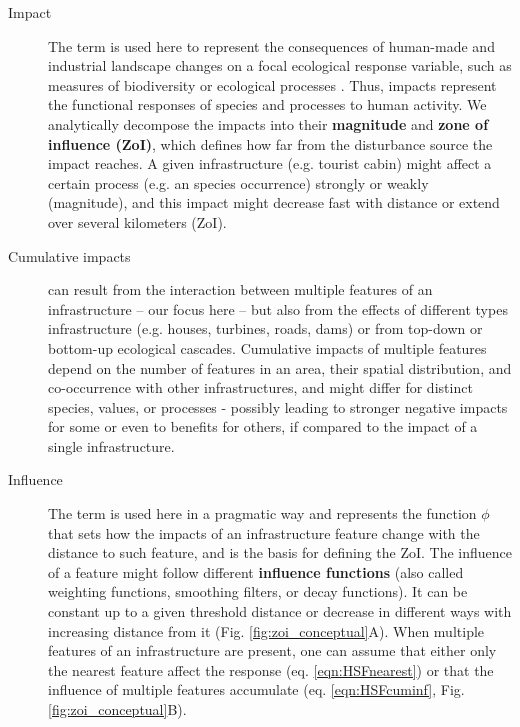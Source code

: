 \documentclass[titlepage]{article}
\begin{document}
\begin{tcolorbox}[width=1.3\textwidth,center,colback=yellow!5,colframe=yellow!75!black,title={Box 1 -- Definitions}]

\begin{description}

    \item[Impact] The term is used here to represent the consequences of human-made and industrial landscape changes on a focal ecological response variable, such as measures of biodiversity or ecological processes \citep{naugle_unifying_2011}. Thus, impacts represent the functional responses of species and processes to human activity. We analytically decompose the impacts into their \textbf{magnitude} and \textbf{zone of influence (ZoI)}, which defines how far from the disturbance source the impact reaches. A given infrastructure (e.g. tourist cabin) might affect a certain process (e.g. an species occurrence) strongly or weakly (magnitude), and this impact might decrease fast with distance or extend over several kilometers (ZoI).
    
    \item[Cumulative impacts] can result from the interaction between multiple features of an infrastructure -- our focus here -- but also from the effects of different types infrastructure (e.g. houses, turbines, roads, dams) or from top-down or bottom-up ecological cascades. Cumulative impacts of multiple features depend on the number of features in an area, their spatial distribution, and co-occurrence with other infrastructures, and might differ for distinct species, values, or processes - possibly leading to stronger negative impacts for some or even to benefits for others, if compared to the impact of a single infrastructure.
    
    \item[Influence] The term is used here in a pragmatic way and represents the function $\phi$ that sets how the impacts of an infrastructure feature change with the distance to such feature, and is the basis for defining the ZoI. The influence of a feature might follow different \textbf{influence functions} (also called weighting functions, smoothing filters, or decay functions). It can be constant up to a given threshold distance or decrease in different ways with increasing distance from it (Fig. \ref{fig:zoi_conceptual}A). When multiple features of an infrastructure are present, one can assume that either only the nearest feature affect the response (eq. \ref{eqn:HSFnearest}) or that the influence of multiple features accumulate (eq. \ref{eqn:HSFcuminf}, Fig. \ref{fig:zoi_conceptual}B).
    

\end{description}
\end{tcolorbox}
\end{document}
